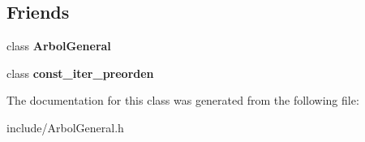 \subsection*{Friends}
\begin{DoxyCompactItemize}
\item 
class {\bfseries Arbol\+General}\hypertarget{class_arbol_general_1_1iter__preorden_a9c06e31b7c3e0d4ee5b03003d32935a5}{}\label{class_arbol_general_1_1iter__preorden_a9c06e31b7c3e0d4ee5b03003d32935a5}

\item 
class {\bfseries const\+\_\+iter\+\_\+preorden}\hypertarget{class_arbol_general_1_1iter__preorden_a261eeacbae91f7ffc60fba6eb13c745e}{}\label{class_arbol_general_1_1iter__preorden_a261eeacbae91f7ffc60fba6eb13c745e}

\end{DoxyCompactItemize}


The documentation for this class was generated from the following file\+:\begin{DoxyCompactItemize}
\item 
include/Arbol\+General.\+h\end{DoxyCompactItemize}
